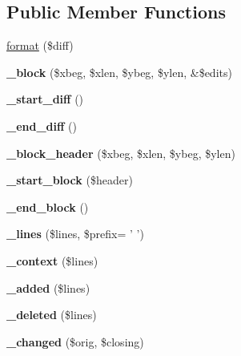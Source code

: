 \subsection*{Public Member Functions}
\begin{CompactItemize}
\item 
\hyperlink{classDiffFormatter_5c24d365dc779a9825c26c8a2977590a}{format} (\$diff)
\item 
\hypertarget{classDiffFormatter_5c51cf55c54d77cbac1ef3677b5afe9e}{
\textbf{\_\-block} (\$xbeg, \$xlen, \$ybeg, \$ylen, \&\$edits)}
\label{classDiffFormatter_5c51cf55c54d77cbac1ef3677b5afe9e}

\item 
\hypertarget{classDiffFormatter_45e1b9cbb0d7ab81127ecfbc824a926b}{
\textbf{\_\-start\_\-diff} ()}
\label{classDiffFormatter_45e1b9cbb0d7ab81127ecfbc824a926b}

\item 
\hypertarget{classDiffFormatter_dd4a7543c657d48868bed46e5ca83c9b}{
\textbf{\_\-end\_\-diff} ()}
\label{classDiffFormatter_dd4a7543c657d48868bed46e5ca83c9b}

\item 
\hypertarget{classDiffFormatter_1caeac183aeb1e932e69758850182069}{
\textbf{\_\-block\_\-header} (\$xbeg, \$xlen, \$ybeg, \$ylen)}
\label{classDiffFormatter_1caeac183aeb1e932e69758850182069}

\item 
\hypertarget{classDiffFormatter_164da99c15cbd49cbc1c20d2a6823949}{
\textbf{\_\-start\_\-block} (\$header)}
\label{classDiffFormatter_164da99c15cbd49cbc1c20d2a6823949}

\item 
\hypertarget{classDiffFormatter_4ad045d38aaa856dae6a463e5caa2974}{
\textbf{\_\-end\_\-block} ()}
\label{classDiffFormatter_4ad045d38aaa856dae6a463e5caa2974}

\item 
\hypertarget{classDiffFormatter_160347647095532cdde8cd85894c7dd6}{
\textbf{\_\-lines} (\$lines, \$prefix= ' ')}
\label{classDiffFormatter_160347647095532cdde8cd85894c7dd6}

\item 
\hypertarget{classDiffFormatter_d306b256b5af3e2869492fa69d5e7005}{
\textbf{\_\-context} (\$lines)}
\label{classDiffFormatter_d306b256b5af3e2869492fa69d5e7005}

\item 
\hypertarget{classDiffFormatter_d466d534ead9f74654a7bd825cc97919}{
\textbf{\_\-added} (\$lines)}
\label{classDiffFormatter_d466d534ead9f74654a7bd825cc97919}

\item 
\hypertarget{classDiffFormatter_5173dfafc114575ee5c16333980a6888}{
\textbf{\_\-deleted} (\$lines)}
\label{classDiffFormatter_5173dfafc114575ee5c16333980a6888}

\item 
\hypertarget{classDiffFormatter_2c7bb47b2d67708f6f5c47548d2e15f8}{
\textbf{\_\-changed} (\$orig, \$closing)}
\label{classDiffFormatter_2c7bb47b2d67708f6f5c47548d2e15f8}

\end{CompactItemize}

